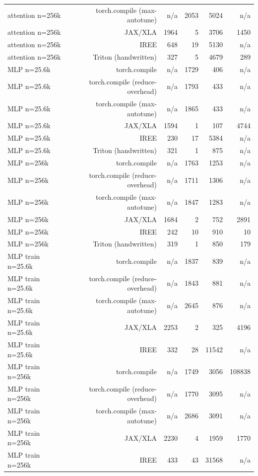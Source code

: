 \begin{tabular}{lrrrrr}
attention n=256k & torch.compile (max-autotune) & n/a & 2053 & 5024 & n/a \\
attention n=256k & JAX/XLA & 1964 & 5 & 3706 & 1450 \\
attention n=256k & IREE & 648 & 19 & 5130 & n/a \\
attention n=256k & Triton (handwritten) & 327 & 5 & 4679 & 289 \\
MLP n=25.6k & torch.compile & n/a & 1729 & 406 & n/a \\
MLP n=25.6k & torch.compile (reduce-overhead) & n/a & 1793 & 433 & n/a \\
MLP n=25.6k & torch.compile (max-autotune) & n/a & 1865 & 433 & n/a \\
MLP n=25.6k & JAX/XLA & 1594 & 1 & 107 & 4744 \\
MLP n=25.6k & IREE & 230 & 17 & 5384 & n/a \\
MLP n=25.6k & Triton (handwritten) & 321 & 1 & 875 & n/a \\
MLP n=256k & torch.compile & n/a & 1763 & 1253 & n/a \\
MLP n=256k & torch.compile (reduce-overhead) & n/a & 1711 & 1306 & n/a \\
MLP n=256k & torch.compile (max-autotune) & n/a & 1847 & 1283 & n/a \\
MLP n=256k & JAX/XLA & 1684 & 2 & 752 & 2891 \\
MLP n=256k & IREE & 242 & 10 & 910 & 10 \\
MLP n=256k & Triton (handwritten) & 319 & 1 & 850 & 179 \\
MLP train n=25.6k & torch.compile & n/a & 1837 & 839 & n/a \\
MLP train n=25.6k & torch.compile (reduce-overhead) & n/a & 1843 & 881 & n/a \\
MLP train n=25.6k & torch.compile (max-autotune) & n/a & 2645 & 876 & n/a \\
MLP train n=25.6k & JAX/XLA & 2253 & 2 & 325 & 4196 \\
MLP train n=25.6k & IREE & 332 & 28 & 11542 & n/a \\
MLP train n=256k & torch.compile & n/a & 1749 & 3056 & 108838 \\
MLP train n=256k & torch.compile (reduce-overhead) & n/a & 1770 & 3095 & n/a \\
MLP train n=256k & torch.compile (max-autotune) & n/a & 2686 & 3091 & n/a \\
MLP train n=256k & JAX/XLA & 2230 & 4 & 1959 & 1770 \\
MLP train n=256k & IREE & 433 & 43 & 31568 & n/a \\

\end{tabular}
